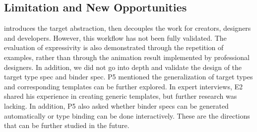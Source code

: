 \subsection{Limitation and New Opportunities}
\gaia{} introduces the target abstraction, then decouples the work for creators, designers and developers.
However, this workflow has not been fully validated.
The evaluation of expressivity is also demonstrated through the repetition of examples, rather than through the animation result implemented by professional designers.
In addition, we did not go into depth and validate the design of the target type spec and binder spec.
P5 mentioned the generalization of target types and corresponding templates can be further explored.
In expert interviews, E2 shared his experience in creating generic templates, but further research was lacking.
In addition, P5 also asked whether binder specs can be generated automatically or type binding can be done interactively.
These are the directions that can be further studied in the future.